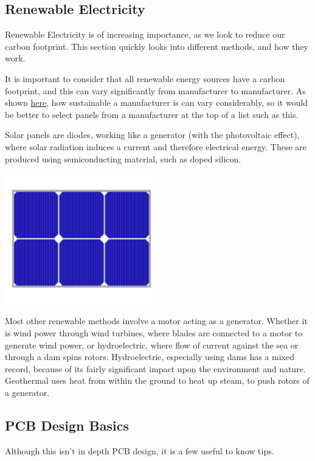 \documentclass[a4paper,11pt]{report}
\begin{document}
\subsection{Renewable Electricity}

Renewable Electricity is of increasing importance, as we look to reduce our carbon footprint. This section quickly looks into different methods, and how they work.

It is important to consider that all renewable energy sources have a carbon footprint, and this can vary significantly from manufacturer to manufacturer. As shown \href{http://www.solarscorecard.com/2018-19/2018-19-SVTC-Solar-Scorecard.pdf}{here}, how sustainable a manufacturer is can vary considerably, so it would be better to select panels from a manufacturer at the top of a list such as this.

Solar panels are diodes, working like a generator (with the photovoltaic effect), where solar radiation induces a current and therefore electrical energy. These are produced using semiconducting material, such as doped silicon.

\includegraphics[width=0.5\textwidth]{solarpanel}

Most other renewable methods involve a motor acting as a generator. Whether it is wind power through wind turbines, where blades are connected to a motor to generate wind power, or hydroelectric, where flow of current against the sea or through a dam spins rotors. Hydroelectric, especially using dams has a mixed record, because of its fairly significant impact upon the environment and nature. Geothermal uses heat from within the ground to heat up steam, to push rotors of a generator.

\subsection{PCB Design Basics}

Although this isn't in depth PCB design, it is a few useful to know tips.
\end{document}
